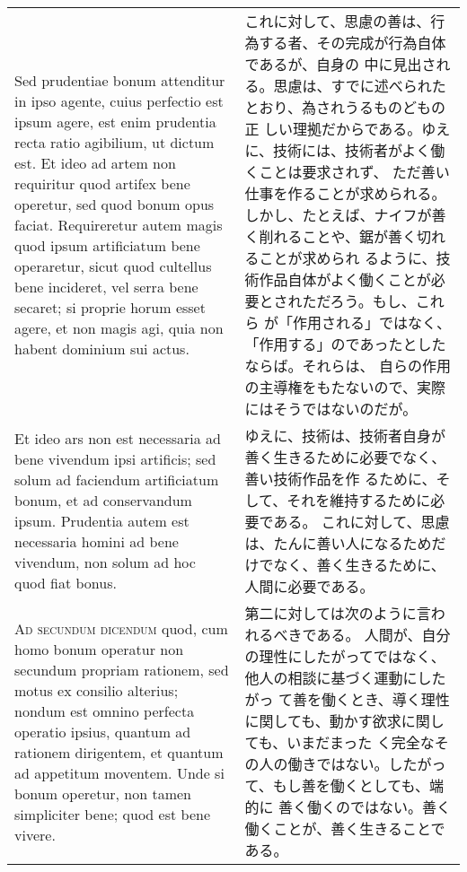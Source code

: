 \documentclass[10pt]{jsarticle} %
\begin{document}
\begin{longtable}{p{21em}p{21em}}
\\



Sed prudentiae bonum
 attenditur in ipso agente, cuius perfectio est ipsum agere, est enim
 prudentia recta ratio agibilium, ut dictum est. Et ideo ad artem non
 requiritur quod artifex bene operetur, sed quod bonum opus
 faciat. Requireretur autem magis quod ipsum artificiatum bene
 operaretur, sicut quod cultellus bene incideret, vel serra bene
 secaret; si proprie horum esset agere, et non magis agi, quia non
 habent dominium sui actus. 


&

これに対して、思慮の善は、行為する者、その完成が行為自体であるが、自身の
 中に見出される。思慮は、すでに述べられたとおり、為されうるものどもの正
 しい理拠だからである。ゆえに、技術には、技術者がよく働くことは要求されず、
 ただ善い仕事を作ることが求められる。
しかし、たとえば、ナイフが善く削れることや、鋸が善く切れることが求められ
 るように、技術作品自体がよく働くことが必要とされただろう。もし、これら
 が「作用される」ではなく、「作用する」のであったとしたならば。それらは、
 自らの作用の主導権をもたないので、実際にはそうではないのだが。


\\



Et ideo ars non est necessaria ad bene
 vivendum ipsi artificis; sed solum ad faciendum artificiatum bonum, et
 ad conservandum ipsum. 
Prudentia autem est necessaria homini ad bene
 vivendum, non solum ad hoc quod fiat bonus.


&

ゆえに、技術は、技術者自身が善く生きるために必要でなく、善い技術作品を作
 るために、そして、それを維持するために必要である。
これに対して、思慮は、たんに善い人になるためだけでなく、善く生きるために、
 人間に必要である。

\\


{\scshape Ad secundum dicendum} quod, cum homo
 bonum operatur non secundum propriam rationem, sed motus ex consilio
 alterius; nondum est omnino perfecta operatio ipsius, quantum ad
 rationem dirigentem, et quantum ad appetitum moventem. Unde si bonum
 operetur, non tamen simpliciter bene; quod est bene vivere.


&

第二に対しては次のように言われるべきである。
人間が、自分の理性にしたがってではなく、他人の相談に基づく運動にしたがっ
 て善を働くとき、導く理性に関しても、動かす欲求に関しても、いまだまった
 く完全なその人の働きではない。したがって、もし善を働くとしても、端的に
 善く働くのではない。善く働くことが、善く生きることである。


\end{longtable}
\end{document}
